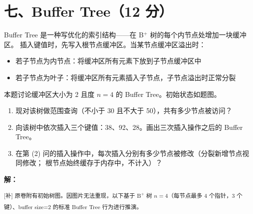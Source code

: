 \documentclass[11pt,a4paper]{article}
\newcommand{\solution}{\par\noindent\textcolor{ansblue}{\textbf{解：}}}
\newcommand{\supp}[1]{\textcolor{ansred}{\textsuperscript{[补] #1}}}
\begin{document}
\newpage
\section*{七、Buffer Tree（12 分）}

Buffer Tree 是一种写优化的索引结构——在 B$^+$ 树的每个内节点处增加一块缓冲区。
插入键值时，先写入根节点缓冲区。当某节点缓冲区溢出时：
\begin{itemize}[nosep]
  \item 若子节点为内节点：将缓冲区所有元素下放到子节点缓冲区中
  \item 若子节点为叶子：将缓冲区所有元素插入子节点，子节点溢出时正常分裂
\end{itemize}

本题讨论缓冲区大小为 2 且度 $n=4$ 的 Buffer Tree。初始状态如题图。

\begin{enumerate}[label=(\arabic*),leftmargin=*]
  \item 现对该树做范围查询（不小于 30 且不大于 50），共有多少节点被访问？
  \item 向该树中依次插入三个键值：38、92、28。画出三次插入操作之后的 Buffer Tree。
  \item 在第 (2) 问的插入操作中，每次插入分别有多少节点被修改（分裂新增节点视同修改；
        根节点始终缓存于内存中，不计入）？
\end{enumerate}

\solution

\supp{原卷附有初始树图。因图片无法重现，以下基于 B$^+$ 树 $n=4$（每节点最多 4 个指针，3 个键）、buffer size=2 的标准 Buffer Tree 行为进行推演。}
\end{document}
